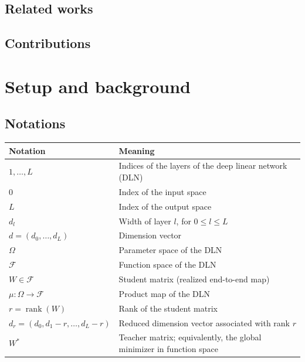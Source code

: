 \documentclass{article}
\newcommand{\rk}{\operatorname{rank}}
\theoremstyle{definition}
\begin{document}
\subsection{Related works}


\subsection{Contributions}


\section{Setup and background}
\subsection{Notations}
\begin{center}
\renewcommand{\arraystretch}{1.15}
\begin{tabular}{p{} p{}}
\toprule
\textbf{Notation} & \textbf{Meaning} \\
\midrule
$1,\dots,L$ & Indices of the layers of the deep linear network (DLN) \\

$0$ & Index of the input space \\

$L$ & Index of the output space \\

$d_l$ & Width of layer $l$, for $0 \leq l \leq L$ \\

$d=(d_0,\dots,d_L)$ & Dimension vector \\

$\Omega$ & Parameter space of the DLN \\

$\mathcal{F}$ & Function space of the DLN \\

$W \in \mathcal{F}$ & Student matrix (realized end-to-end map) \\

$\mu:\Omega\to\mathcal{F}$ & Product map of the DLN \\

$r=\rk(W)$ & Rank of the student matrix \\

$d_r=(d_0,d_1-r,\dots,d_L-r)$ & Reduced dimension vector associated with rank $r$ \\

$W^\ast$ & Teacher matrix; equivalently, the global minimizer in function space \\


\end{tabular}
\end{center}
\end{document}
